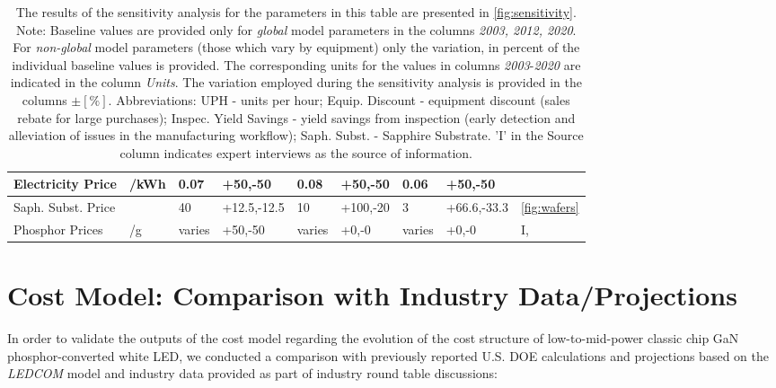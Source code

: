 \documentclass[parskip=full]{article}
\begin{document}
\begin{table}[]
\begin{NiceTabularX}{1.1\textwidth}{ |X|X|l|l|l|l|l|l|X|}
        \hline
            Electricity Price & /kWh & 0.07 & +50,-50 & 0.08 & +50,-50 & 0.06 & +50,-50 & \cite{eia2000electric}\cite{eia2019electric} \\
        \hline
            Saph. Subst. Price &  & 40 & +12.5,-12.5 & 10 & +100,-20 & 3 & +66.6,-33.3 & \cref{fig:wafers} \\
        \hline
            Phosphor Prices & /g & varies & +50,-50 & varies & +0,-0 & varies & +0,-0 & I, \cite{yole_phosphor_2012}\cite{yole2017phosphor} \\
        \hline
        \end{NiceTabularX}
    \vspace{2mm}
    \caption*{The results of the sensitivity analysis for the parameters in this table are presented in \cref{fig:sensitivity}. Note: Baseline values are provided only for \textit{global} model parameters in the columns \textit{2003, 2012, 2020}. For \textit{non-global} model parameters (those which vary by equipment) only the variation, in percent of the individual baseline values is provided. The corresponding units for the values in columns \textit{2003}-\textit{2020} are indicated in the column \textit{Units}. The variation employed during the sensitivity analysis is provided in the columns $\pm [\%]$. Abbreviations: UPH - units per hour; Equip. Discount - equipment discount (sales rebate for large purchases); Inspec. Yield Savings - yield savings from inspection (early detection and alleviation of issues in the manufacturing workflow); Saph. Subst. - Sapphire Substrate. ’I’ in the Source column indicates expert interviews as the source of information.}
    \label{tab:sensitivity}
\end{table}


\clearpage
\section{Cost Model: Comparison with Industry Data/Projections}
\label{sec:cost_model_calibration}

In order to validate the outputs of the cost model regarding the evolution of the cost structure of low-to-mid-power classic chip GaN phosphor-converted white LED, we conducted a comparison with previously reported U.S. DOE calculations and projections based on the \textit{LEDCOM} model and industry data provided as part of industry round table discussions:
\end{document}
